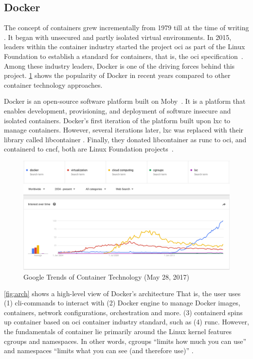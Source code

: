 \clearpage
\subsection{Docker}\label{background:docker}
The concept of containers grew incrementally from 1979 till at the time of writing \cite{TheEvolu99:online, Momentsi23:online, ABriefHi14:online, TheHisto4:online, AboutOp82:online}.
It began with unsecured and partly isolated virtual environments.
In 2015, leaders within the container industry started the project \gls{oci} as part of the Linux Foundation to establish a standard for containers, that is, the \gls{oci} specification~\cite{AboutOp82:online, Projects37:online}.
Among these industry leaders, Docker is one of the driving forces behind this project.
\cref{fig:trend} shows the popularity of Docker in recent years compared to other container technology approaches.


\skippara Docker is an open-source software platform built on Moby~\cite{mobymoby68:online, WhatisDo49:online}.
It is a platform that enables development, provisioning, and deployment of software insecure and isolated containers.
Docker's  first iteration of the platform built upon \gls{lxc} to manage containers.
However, several iterations later, \gls{lxc} was replaced with their library called libcontainer \cite{dockerli21:online}.
Finally, they donated libcontainer as runc to \gls{oci}, and containerd to \gls{cncf}, both are Linux Foundation projects~\cite{opencont67:online, containe72:online}.

\begin{figure}[h!]
    \centering
    \includegraphics[width=13cm]{figure/trend}
    \caption{Google Trends of Container Technology (May 28, 2017)}
    \label{fig:trend}
\end{figure}

\skippara \cref{fig:arch} shows a high-level view of Docker's architecture
That is, the user uses (1) \gls{cli}-commands to interact with (2) Docker engine to manage Docker images, containers, network configurations, orchestration and more.
(3) containerd spins up container based on \gls{oci} container industry standard, such as (4) runc.
However, the fundamentals of container lie primarily around the Linux kernel features cgroups and namespaces.
In other words, cgroups ``limits how much you can use'' and namespaces ``limits what you can see (and therefore use)'' \cite{Anatomyo69:online}.

